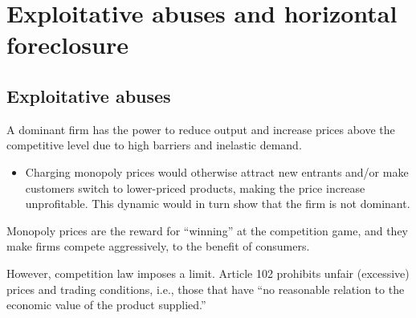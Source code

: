 \setcounter{chapter}{0}
\chapter{Exploitative abuses and horizontal foreclosure}
\vspace{-1.5cm}

\setcounter{chapter}{11}
{\chaptoc\noindent\begin{minipage}[inner sep=0,outer sep=0]{0.9\linewidth}\section*{Exploitative abuses}\end{minipage}}

    A dominant firm has the power to reduce output and increase prices above the competitive level due to high barriers and inelastic demand.
    
    \begin{itemize}
        \item Charging monopoly prices would otherwise attract new entrants and/or make customers switch to lower-priced products, making the price increase unprofitable. This dynamic would in turn show that the firm is not dominant.
    \end{itemize}
    
    Monopoly prices are the reward for “winning” at the competition game, and they make firms compete aggressively, to the benefit of consumers.
    
    However, competition law imposes a limit. Article 102 prohibits unfair (excessive) prices and trading conditions, i.e., those that have “no reasonable relation to the economic value of the product supplied.”
    

